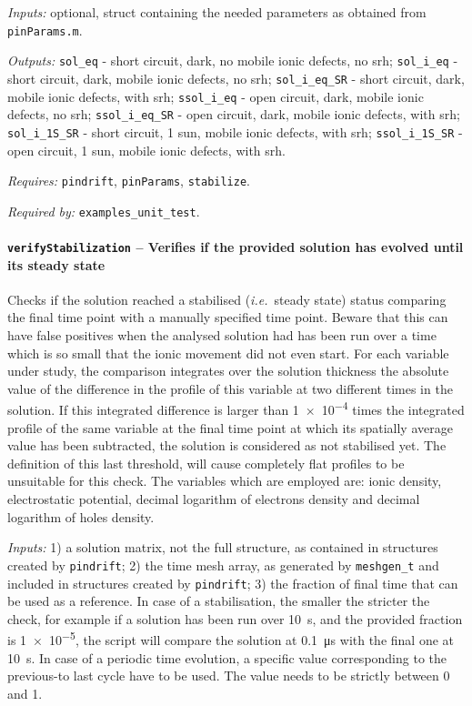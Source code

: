 		\textit{Inputs:} optional, struct containing the needed parameters as obtained
		from \texttt{pin\-Params.m}.

		\textit{Outputs:} \texttt{sol\_eq} - short circuit, dark, no mobile ionic defects, no \gls{srh};
		\texttt{sol\_i\_eq} - short circuit, dark, mobile ionic defects, no \gls{srh};
		\texttt{sol\_i\_eq\_SR} - short circuit, dark, mobile ionic defects, with \gls{srh};
		\texttt{ssol\_i\_eq} - open circuit, dark, mobile ionic defects, no \gls{srh};
		\texttt{ssol\_i\_eq\_SR} - open circuit, dark, mobile ionic defects, with \gls{srh};
		\texttt{sol\_i\_1S\_SR} - short circuit, 1 sun, mobile ionic defects, with \gls{srh};
		\texttt{ssol\_i\_1S\_SR} - open circuit, 1 sun, mobile ionic defects, with \gls{srh}.

		\textit{Requires:} \texttt{pin\-drift}, \texttt{pinParams}, \texttt{stabilize}.

		\textit{Required by:} \texttt{examples\_unit\_test}.

		\paragraph{\texttt{verify\-Stabilization} -- Verifies if the provided solution has evolved until its steady state}\label{verifyStabilization}
		Checks if the solution reached a stabilised (\textsl{i.e.}\ steady state) status comparing the final time point with a manually specified time point. Beware that this can have false positives when the analysed solution had
		has been run over a time which is so small that the ionic movement did not even start.
		For each variable under study, the comparison integrates over the solution thickness the absolute value of the difference in the profile of this variable at two different times in the solution.
		If this integrated difference is larger than \num{1e-4} times the integrated profile of the same variable at the final time point at which its spatially average value has been subtracted, the solution is considered as not stabilised yet.
		The definition of this last threshold, will cause completely flat profiles to be unsuitable for this check.
		The variables which are employed are: ionic density, electrostatic potential, decimal logarithm of electrons density and decimal logarithm of holes density.

		\textit{Inputs:} 1) a solution matrix, not the full structure, as contained in
		structures created by \texttt{pin\-drift};
		2) the time mesh array, as generated by \texttt{meshgen\_t} and included
		in structures created by \texttt{pin\-drift};
		3) the fraction of final time that can be used as a
		reference. In case of a stabilisation, the smaller the stricter the
		check, for example if a solution has been run over \SI{10}{\s}, and the provided fraction is \num{1e-5}, the script will compare the solution at \SI{0.1}{\us} with the final one at \SI{10}{\s}. In case of a periodic time evolution, a specific value
		corresponding to the previous-to last cycle have to be used. The
		value needs to be strictly between 0 and 1.

